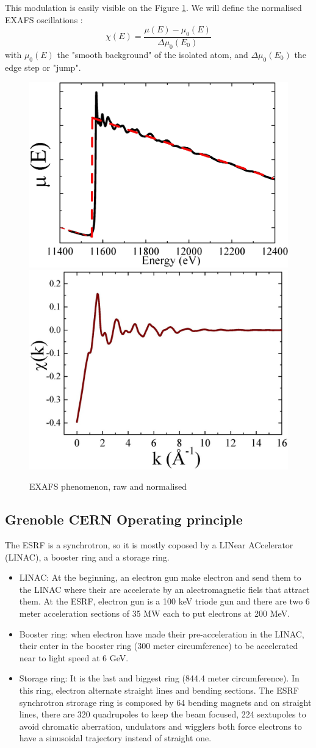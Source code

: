 \documentclass[11pt,a4paper,oneside]{article}
\begin{document}
This modulation is easily visible on the Figure \ref{exafsgraph}. We will define the normalised EXAFS oscillations :
\[\chi(E) = \frac{\mu(E) - \mu_0(E)}{\Delta\mu_0(E_0)}\]
with $\mu_0(E)$ the "smooth background" of the isolated atom, and $\Delta\mu_0(E_0)$ the edge step or "jump".

\begin{figure}[h]
    \begin{center}
        \includegraphics[height=0.35\textwidth]{Images/EXAFS2}
        \includegraphics[height=0.35\textwidth]{Images/relativeEXAFS}
        \caption{EXAFS phenomenon, raw and normalised}
        \label{exafsgraph}
    \end{center}
\end{figure}


\newpage
\subsection{Grenoble CERN Operating principle}

The ESRF is a synchrotron, so it is mostly coposed by a LINear ACcelerator (LINAC), a booster ring and a storage ring.
\begin{itemize}
    \item LINAC: At the beginning, an electron gun make electron and send them to the LINAC where their are accelerate by an alectromagnetic fiels that attract them. At the ESRF, electron gun is a 100 keV triode gun and there are two 6 meter acceleration sections of 35 MW each to put electrons at 200 MeV.
    \item Booster ring: when electron have made their pre-acceleration in the LINAC, their enter in the booster ring (300 meter circumference) to be accelerated near to light speed at 6 GeV.
    \item Storage ring: It is the last and biggest ring (844.4 meter circumference). In this ring, electron alternate straight lines and bending sections. The ESRF synchrotron strorage ring is composed by 64 bending magnets and on straight lines, there are 320 quadrupoles to keep the beam focused, 224 sextupoles to avoid chromatic aberration, undulators and wigglers both force electrons to have a sinusoidal trajectory instead of straight one.
\end{itemize}
\medskip
\end{document}
